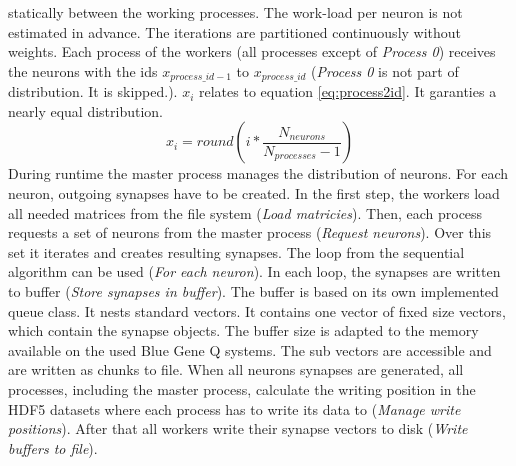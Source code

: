 statically between the working processes.
The work-load per neuron is not estimated in advance.
The iterations are partitioned continuously without weights.
Each process of the workers (all processes except of \emph{Process 0}) receives the neurons with the ids $x_{process\_id-1}$
to $x_{process\_id}$ (\emph{Process 0} is not part of distribution. It is skipped.).
$x_i$ relates to equation \ref{eq:process2id}. It garanties a nearly equal distribution.
\begin{equation}
	x_i = round(i * \frac{N_{neurons}}{N_{processes}-1})
	\label{eq:process2id}
\end{equation}
During runtime the master process manages the distribution of neurons. For each neuron, 
outgoing synapses have to be created. In the first step, the workers load all needed matrices from the file system (\emph{Load matricies}).
Then, each process requests a set of neurons from the master process (\emph{Request neurons}). Over this set it iterates and creates resulting
synapses. The loop from the sequential algorithm can be used (\emph{For each neuron}).
In each loop, the synapses are written to buffer (\emph{Store synapses in buffer}).
The buffer is based on its own implemented queue class. It nests standard vectors.
It contains one vector of fixed size vectors, which contain the synapse objects.
The buffer size is adapted to 
the memory available on the used Blue Gene Q systems.
The sub vectors are accessible and are written as chunks to file.
When all neurons synapses are generated, all processes, including the master process, calculate the writing position
in the HDF5 datasets where each process has to write its data to (\emph{Manage write positions}). After that all workers write their synapse vectors to
disk (\emph{Write buffers to file}).




